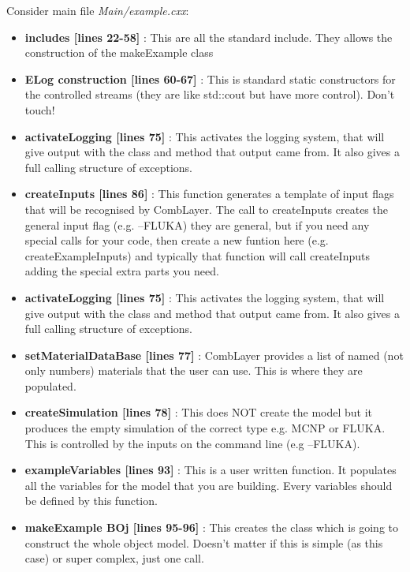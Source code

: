 Consider main file {\it Main/example.cxx}:
\begin{itemize}
\item{{\bf includes [lines 22-58]} : This are all the standard include. They allows the construction of the makeExample class}
\item{{\bf ELog construction [lines 60-67]} : This is standard static constructors for the controlled streams (they are like std::cout but have more control). Don't touch! }

\item{{\bf activateLogging [lines 75]} : This activates the logging
  system, that will give output with the class and method that output
  came from. It also gives a full calling structure of exceptions.}
  
\item{{\bf createInputs [lines 86]} : This function generates a template
  of input flags that will be recognised by CombLayer.
  The call to createInputs creates the general input flag (e.g.
  --FLUKA) they are general, but if you need any special calls for
  your code, then create a new funtion here (e.g. createExampleInputs)
  and typically that function will call createInputs adding
  the special extra parts you need.}


\item{{\bf activateLogging [lines 75]} : This activates the logging
  system, that will give output with the class and method that output
  came from. It also gives a full calling structure of exceptions.}
  

\item{{\bf setMaterialDataBase [lines 77]} : CombLayer provides a list
  of named (not only numbers) materials that the user can use. This
is where they are populated.}

\item{{\bf createSimulation [lines 78]} : This does NOT create the model
  but it produces the empty simulation of the correct type e.g. MCNP or FLUKA.
  This is controlled by the inputs on the command line (e.g --FLUKA).}

\item{{\bf exampleVariables [lines 93]} : This is a user written function.
  It populates all the variables for the model that you are building. Every variables should be defined by this function.}

\item{{\bf makeExample BOj [lines 95-96]} :
  This creates the class which is going to construct the whole object
  model. Doesn't matter if this is simple (as this case) or super complex,
  just one call. }


\end{itemize}
